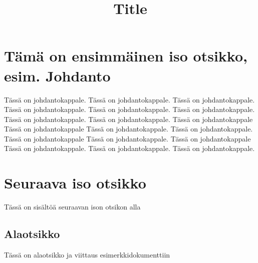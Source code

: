 \documentclass[a4paper]{article}
\begin{document}
\title{\huge Title}
\maketitle

\section{Tämä on ensimmäinen iso otsikko, esim. Johdanto}

Tässä on johdantokappale. Tässä on johdantokappale. Tässä on johdantokappale. Tässä on johdantokappale. Tässä on johdantokappale. Tässä on johdantokappale. Tässä on johdantokappale. Tässä on johdantokappale. Tässä on johdantokappale Tässä on johdantokappale Tässä on johdantokappale. Tässä on johdantokappale. Tässä on johdantokappale Tässä on johdantokappale. Tässä on johdantokappale Tässä on johdantokappale. Tässä on johdantokappale. Tässä on johdantokappale.

\section{Seuraava iso otsikko}

Tässä on sisältöä seuraavan ison otsikon alla

\subsection{Alaotsikko}

Tässä on alaotsikko ja viittaus esimerkkidokumenttiin \citep{koski2012}




\end{document}
